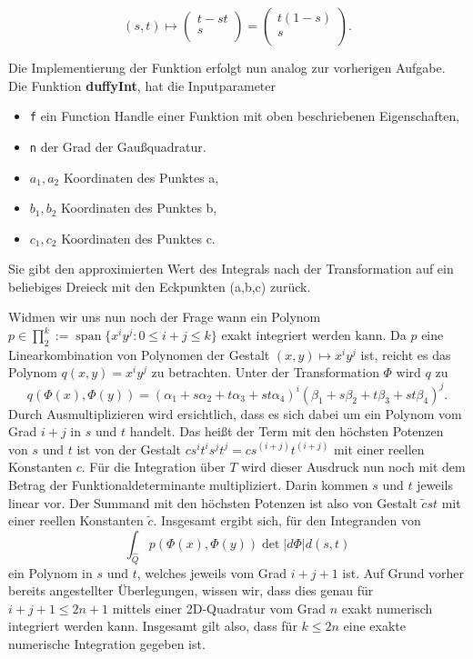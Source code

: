 \documentclass[a4paper,11pt,bibliography=totoc,listof=totoc,headinclude=true,cleardoublepage=empty,oneside]{scrbook}
\newcommand{\code}[1]{\texttt{\color{change}#1}}
\DeclareMathOperator*{\SPAN}{span}
\begin{document}
\begin{equation}
	(s,t) \mapsto  \left(
	\begin{array}{ccc}
	t-st\\
	s\\
	\end{array}
	\right) = \left(
	\begin{array}{ccc}
	t(1-s)\\
	s\\
	\end{array}
	\right).
\end{equation}

Die Implementierung der Funktion erfolgt nun analog zur vorherigen Aufgabe. 
Die Funktion \textbf{duffyInt}, hat die Inputparameter
\begin{itemize}
\item \code{f} ein Function Handle einer Funktion mit oben beschriebenen Eigenschaften,
\item \code{n} der Grad der Gaußquadratur.
\item \code{$a_1,a_2$} Koordinaten des Punktes a,
\item \code{$b_1,b_2$} Koordinaten des Punktes b,
\item \code{$c_1,c_2$} Koordinaten des Punktes c.
\end{itemize} 
Sie gibt den approximierten Wert des Integrals nach der Transformation auf ein beliebiges Dreieck mit den Eckpunkten (a,b,c) zurück.

{\color{change}
\lstset{ 
language=Matlab, 
showstringspaces=false}
 }




Widmen wir uns nun noch der Frage wann ein Polynom $ p \in \prod_{2}^k:=\SPAN\{x^iy^j:0 \leq i+j\leq k \} $ exakt integriert werden kann. Da $p$ eine Linearkombination von Polynomen der Gestalt $(x,y) \mapsto x^iy^j$ ist, reicht es das Polynom $q(x,y) = x^iy^j$ zu betrachten. Unter der Transformation $\Phi$ wird $q$ zu 
\begin{equation*}
	q(\Phi(x),\Phi(y)) = (\alpha_1+s\alpha_2+t\alpha_3+st\alpha_4)^i(\beta_1+s\beta_2+t\beta_3+st\beta_4)^j.
\end{equation*}
Durch Ausmultiplizieren wird ersichtlich, dass es sich dabei um ein Polynom vom Grad $i+j$ in $s$ und $t$ handelt. Das heißt der Term mit den höchsten Potenzen von $s$ und $t$ ist von der Gestalt $cs^it^is^jt^j = cs^{(i+j)}t^{(i+j)}$ mit einer reellen Konstanten $c$. Für die Integration über $T$ wird dieser Ausdruck nun noch mit dem Betrag der Funktionaldeterminante multipliziert. Darin kommen $s$ und $t$ jeweils linear vor. Der Summand mit den höchsten Potenzen ist also von Gestalt $\tilde{c}st$ mit einer reellen Konstanten $\tilde{c}$. Insgesamt ergibt sich, für den Integranden von 
\begin{equation*}
	\int_{\hat{Q}}^{} p(\Phi(x),\Phi(y)) \det|d\Phi| d(s,t)
\end{equation*}
ein Polynom in $s$ und $t$, welches jeweils vom Grad $i+j+1$ ist. Auf Grund vorher bereits angestellter Überlegungen, wissen wir, dass dies genau für $i+j+1 \leq 2n+1$ mittels einer 2D-Quadratur vom Grad $n$ exakt numerisch integriert werden kann. Insgesamt gilt also, dass für $k \leq 2n$ eine exakte numerische Integration gegeben ist. 
\end{document}
